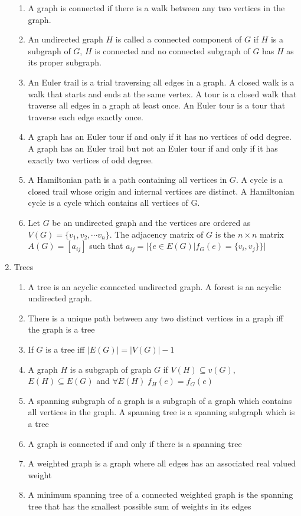 \documentclass[11pt, twocolumn]{article}
\theoremstyle{definition} \newtheorem*{solution}{Solution}
\begin{document}
\begin{enumerate}
\begin{enumerate}
\item A graph is connected if there is a walk between any two vertices in the graph.
\item An undirected graph $H$ is called a connected component of $G$ if $H$ is a subgraph of $G$, $H$ is connected and no connected subgraph of $G$ has $H$ as its proper subgraph.
\item An Euler trail is a trial traversing all edges in a graph. A closed walk is a walk that starts and ends at the same vertex. A tour is a closed walk that traverse all edges in a graph at least once. An Euler tour is a tour that traverse each edge exactly once.
\item A graph has an Euler tour if and only if it has no vertices of odd degree. A graph has an Euler trail but not an Euler tour if and only if it has exactly two vertices of odd degree.
\item A Hamiltonian path is a path containing all vertices in $G$. A cycle is a closed trail whose origin and internal vertices are distinct. A Hamiltonian cycle is a cycle which contains all vertices of G.
\item Let $G$ be an undirected graph and the vertices are ordered as $V(G) = \{v_1, v_2, \cdots v_n\}$. The adjacency matrix of $G$ is the $n\times n$ matrix $A(G) = [a_{ij}]$ such that $a_{ij} = |\{e\in E(G) | f_G(e) = \{v_i, v_j\}\}|$
\end{enumerate}
\item Trees
\begin{enumerate}
\item A tree is an acyclic connected undirected graph. A forest is an acyclic undirected graph.
\item There is a unique path between any two distinct vertices in a graph iff the graph is a tree
\item If $G$ is a tree iff $|E(G)| = |V(G)|-1$
\item A graph $H$ is a subgraph of graph $G$ if $V(H)\subseteq v(G)$, $E(H) \subseteq E(G)$ and $\forall E(H)\; f_H(e) = f_G(e)$
\item A spanning subgraph of a graph is a subgraph of a graph which contains all vertices in the graph. A spanning tree is a spanning subgraph which is a tree
\item A graph is connected if and only if there is a spanning tree
\item A weighted graph is a graph where all edges has an associated real valued weight
\item A minimum spanning tree of a connected weighted graph is the spanning tree that has the smallest possible sum of weights in its edges
\end{enumerate}
\end{enumerate}
\end{document}
